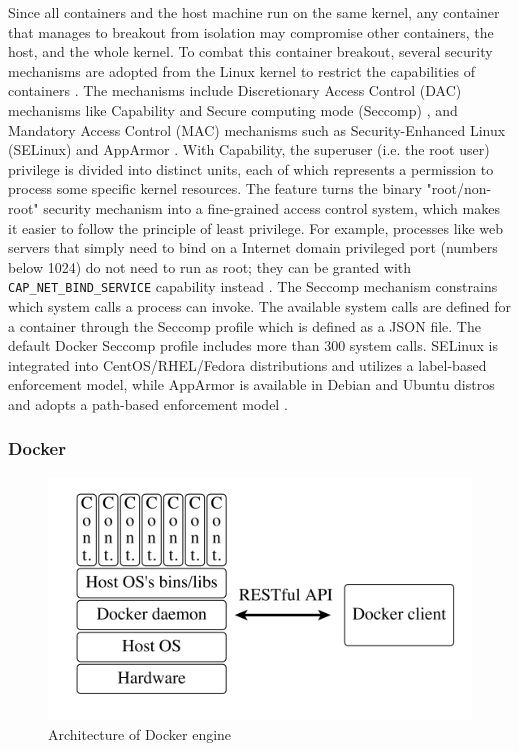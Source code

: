 \documentclass[english, 12pt, a4paper, sci, utf8, a-2b, online]{aaltothesis}
\begin{document}
Since all containers and the host machine run on the same kernel, any container that manages to breakout from isolation may compromise other containers, the host, and the whole kernel. To combat this container breakout, several security mechanisms are adopted from the Linux kernel to restrict the capabilities of containers \cite{lin2018measurement}. The mechanisms include Discretionary Access Control (DAC) mechanisms like Capability \cite{manpages-capabilities} and Secure computing mode (Seccomp) \cite{manpages-seccomp}, and Mandatory Access Control (MAC) mechanisms such as Security-Enhanced Linux (SELinux) and AppArmor \cite{apparmor}. With Capability, the superuser (i.e. the root user) privilege is divided into distinct units, each of which represents a permission to process some specific kernel resources. The feature turns the binary "root/non-root" security mechanism into a fine-grained access control system, which makes it easier to follow the principle of least privilege. For example, processes like web servers that simply need to bind on a Internet domain privileged port (numbers below 1024) do not need to run as root; they can be granted with \texttt{CAP\_NET\_BIND\_SERVICE} capability instead \cite{docker-security}. The Seccomp mechanism constrains which system calls a process can invoke. The available system calls are defined for a container through the Seccomp profile which is defined as a JSON file. The default Docker Seccomp profile \cite{docker-default-seccomp} includes more than 300 system calls. SELinux is integrated into CentOS/RHEL/Fedora distributions and utilizes a label-based enforcement model, while AppArmor is available in Debian and Ubuntu distros and adopts a path-based enforcement model \cite{lin2018measurement}.

\subsubsection{Docker}

\begin{figure}[h!]
  \centering
  \includegraphics[width=\linewidth]{files/docker-engine.png} %
  \caption{Architecture of Docker engine \cite{bui2015analysis}}
  \label{figure-docker}
\end{figure}
\end{document}
